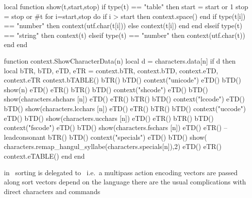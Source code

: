 


\startdocument
  [title=Sorting,
   subtitle=registers,
   location=\ConTeXt\ Meeting 2011]

\startluacode

local function show(t,start,stop)
    if type(t) == "table" then
        start = start or 1
        stop = stop or #t
        for i=start,stop do
            if i > start then
                context.space()
            end
            if type(t[i]) == "number" then
                context(utf.char(t[i]))
            else
                context(t[i])
            end
        end
    elseif type(t) == "string" then
        context(t)
    elseif type(t) == "number" then
        context(utf.char(t))
    end
end

function context.ShowCharacterData(n)
    local d = characters.data[n]
    if d then
        local bTR, bTD, eTD, eTR = context.bTR, context.bTD, context.eTD, context.eTR
        context.bTABLE()
            bTR() bTD() context("unicode")  eTD() bTD() show(n)                      eTD() eTR()
            bTR() bTD() context("shcode")   eTD() bTD() show(characters.shchars [n]) eTD() eTR()
            bTR() bTD() context("lccode")   eTD() bTD() show(characters.lcchars [n]) eTD() eTR()
            bTR() bTD() context("uccode")   eTD() bTD() show(characters.ucchars [n]) eTD() eTR()
            bTR() bTD() context("fscode")   eTD() bTD() show(characters.fschars [n]) eTD() eTR() -- leadconsonant
            bTR() bTD() context("specials") eTD() bTD() show(
               characters.remap_hangul_syllabe(characters.specials[n]),2) eTD() eTR()
        context.eTABLE()
    end
end

\stopluacode

\unexpanded{}


\StartSteps
\startitemize
\startitem in \MKII\ sorting is delegated to \TEXUTIL\ i.e.\ a multipass action \stopitem \FlushStep
\startitem encoding vectors are passed along \stopitem \FlushStep
\startitem sort vectors depend on the language \stopitem \FlushStep
\startitem there are the usual complications with direct characters and commands \stopitem \FlushStep
\stopitemize
\StopSteps


